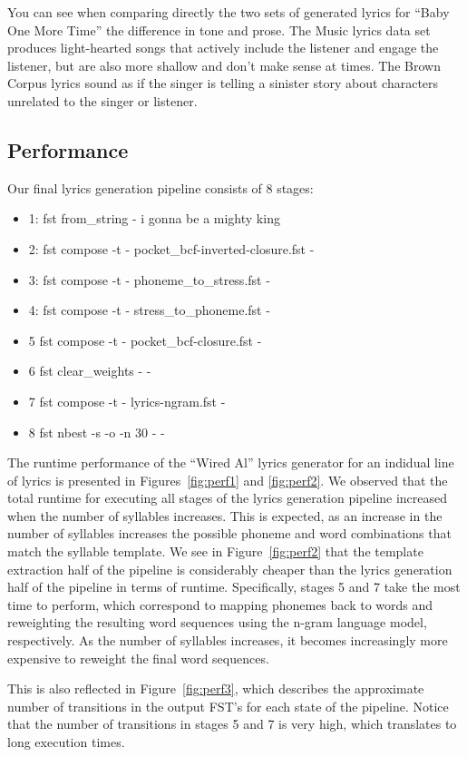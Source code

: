 \documentclass{vgtc}                          %
\begin{document}
You can see when comparing directly the two sets of generated
lyrics for ``Baby One More Time'' the difference in tone and prose. The Music
lyrics data set produces light-hearted songs that actively include the listener and engage the
listener, but are also more shallow and don't make sense at times.
The Brown Corpus lyrics sound as if the singer is telling a sinister story
about characters unrelated to the singer or listener.

\subsection{Performance}
Our final lyrics generation pipeline consists of 8 stages:
\begin{itemize}
  \item 1: fst from\_string - i gonna be a mighty king
  \item 2: fst compose -t - pocket\_bcf-inverted-closure.fst -
  \item 3: fst compose -t - phoneme\_to\_stress.fst -
  \item 4: fst compose -t - stress\_to\_phoneme.fst -
  \item 5 fst compose -t - pocket\_bcf-closure.fst -
  \item 6 fst clear\_weights - -
  \item 7 fst compose -t - lyrics-ngram.fst -
  \item 8 fst nbest -s -o -n 30 - -
\end{itemize}

The runtime performance of the ``Wired Al'' lyrics generator for an indidual
line of lyrics is presented
in Figures~\ref{fig:perf1} and \ref{fig:perf2}. We observed that the
total runtime for executing all stages of the lyrics generation
pipeline increased when the number of syllables increases. This is
expected, as an increase in the number of syllables increases
the possible phoneme and word combinations that match the
syllable template.
We see in Figure~\ref{fig:perf2} that
the template extraction half of the pipeline is considerably
cheaper than the lyrics generation half of the pipeline
in terms of runtime. Specifically, stages 5 and 7 take the most
time to perform, which correspond
to mapping phonemes back to words and reweighting the resulting
word sequences using the n-gram language model, respectively.
As the number of syllables increases, it becomes increasingly
more expensive to reweight the final word sequences.

This is also reflected in Figure~\ref{fig:perf3}, which
describes the approximate number of transitions in the
output FST's for each state of the pipeline.
Notice that the number of transitions in stages 5 and 7
is very high, which translates to long execution
times.
\end{document}
